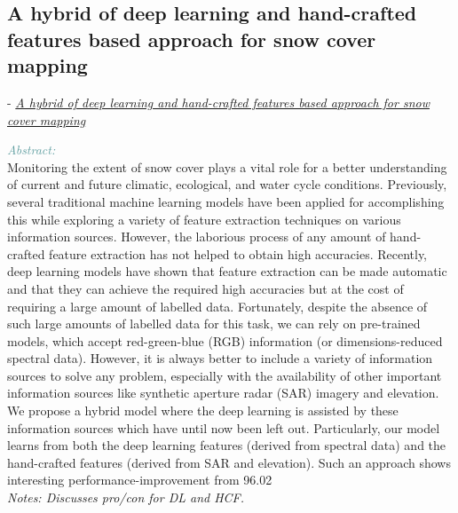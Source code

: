 \documentclass[]{article}
\newcommand{\paperentry}[4]{
            \hangindent=1cm
            \cite{#1} - \href{run:../References/#3}{\textcolor{Sepia}{\textit{#2}}}
            
            \noindent            
            \begin{minipage}[t]{0.1\linewidth}\hfill\end{minipage}
            \begin{minipage}[t]{0.8\linewidth}\textcolor{CadetBlue}{{\textit{Abstract:}}}\\#4\end{minipage}
            \vspace{.25cm}
          }
\begin{document}
 \subsection{A hybrid of deep learning and hand-crafted features based approach for snow cover mapping}
  \paperentry{Nijhawan2019snowmap}
 {A hybrid of deep learning and hand-crafted features based approach for snow cover mapping}
 {Existing Approaches to Texture Analysis/Deep neural networks for texture classification—A theoretical analysis.pdf}
 {Monitoring the extent of snow cover plays a vital role for a better understanding of current and future climatic, ecological, and water cycle conditions. Previously, several traditional machine learning models have been applied for accomplishing this while exploring a variety of feature extraction techniques on various information sources. However, the laborious process of any amount of hand-crafted feature extraction has not helped to obtain high accuracies. Recently, deep learning models have shown that feature extraction can be made automatic and that they can achieve the required high accuracies but at the cost of requiring a large amount of labelled data. Fortunately, despite the absence of such large amounts of labelled data for this task, we can rely on pre-trained models, which accept red-green-blue (RGB) information (or dimensions-reduced spectral data). However, it is always better to include a variety of information sources to solve any problem, especially with the availability of other important information sources like synthetic aperture radar (SAR) imagery and elevation. We propose a hybrid model where the deep learning is assisted by these information sources which have until now been left out. Particularly, our model learns from both the deep learning features (derived from spectral data) and the hand-crafted features (derived from SAR and elevation). Such an approach shows interesting performance-improvement from 96.02%
 	\\\emph{Notes: Discusses pro/con for DL and HCF.}} \\ 
 
\end{document}
